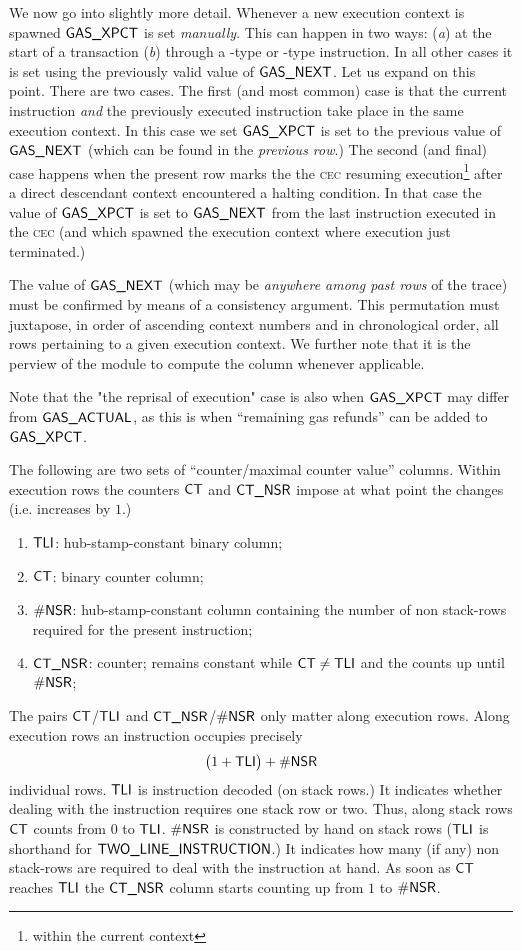 We now go into slightly more detail. Whenever a new execution context is spawned $\textsf{GAS}\textsf{\_XPCT}$ is set \emph{manually}. This can happen in two ways: 
(\emph{a}) at the start of a transaction
(\emph{b}) through a -type or -type instruction.
In all other cases it is set using the previously valid value of $\textsf{GAS}\textsf{\_NEXT}$. Let us expand on this point. There are two cases.
The first (and most common) case is that the current instruction \emph{and} the previously executed instruction take place in the same execution context.
In this case we set $\textsf{GAS}\textsf{\_XPCT}$ is set to the previous value of $\textsf{GAS}\textsf{\_NEXT}$ (which can be found in the \emph{previous row}.)
The second (and final) case happens when the present row marks the the \textsc{cec} resuming execution\footnote{within the current context} after a direct descendant context encountered a halting condition.
In that case the value of $\textsf{GAS}\textsf{\_XPCT}$ is set to $\textsf{GAS}\textsf{\_NEXT}$ from the last instruction executed in the \textsc{cec} (and which spawned the execution context where execution just terminated.)

\saNote{}
The value of $\textsf{GAS}\textsf{\_NEXT}$ (which may be \emph{anywhere among past rows} of the trace) must be confirmed by means of a consistency argument.
This permutation must juxtapose, in order of ascending context numbers and in chronological order, all rows pertaining to a given execution context.
We further note that it is the perview of the \stpMod{} module to compute the \gasStipend{} column whenever applicable.

Note that the "the reprisal of execution" case is also when $\textsf{GAS}\textsf{\_XPCT}$ may differ from $\textsf{GAS}\textsf{\_ACTUAL}$, as this is when ``remaining gas refunds'' can be added to $\textsf{GAS}\textsf{\_XPCT}$.

The following are two sets of ``counter/maximal counter value'' columns. Within execution rows the counters $\textsf{CT}$ and $\textsf{CT}\textsf{\_NSR}$ impose at what point the \hubStamp{} changes (i.e. increases by $1$.)
\begin{enumerate}[resume]
	\item $\textsf{TLI}{}$:
		hub-stamp-constant binary column;
	\item $\textsf{CT}$:
		binary counter column;
	\item $\textsf{\#NSR}$:
		hub-stamp-constant column containing the number of non stack-rows required for the present instruction;
	\item $\textsf{CT}\textsf{\_NSR}$:
		counter; remains constant while $\textsf{CT}\neq\textsf{TLI}$ and the counts up until $\textsf{\#NSR}$;
\end{enumerate}
The pairs
$\textsf{CT}$/$\textsf{TLI}$ and
$\textsf{CT}\textsf{\_NSR}$/$\textsf{\#NSR}$
only matter along execution rows.
Along execution rows an instruction occupies precisely
\[
	\big( 1 + \textsf{TLI} \big) + \textsf{\#NSR}
\]
individual rows.
$\textsf{TLI}$ is instruction decoded (on stack rows.)
It indicates whether dealing with the instruction requires one stack row or two.
Thus, along stack rows $\textsf{CT}$ counts from $0$ to $\textsf{TLI}$.
$\textsf{\#NSR}$ is constructed by hand on stack rows ($\textsf{TLI}$ is shorthand for $\textsf{TWO\_LINE\_INSTRUCTION}{}$.)
It indicates how many (if any) non stack-rows are required to deal with the instruction at hand.
As soon as $\textsf{CT}$ reaches $\textsf{TLI}$ the $\textsf{CT}\textsf{\_NSR}$ column starts counting up from $1$ to $\textsf{\#NSR}$.
